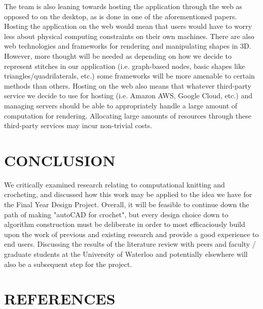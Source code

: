 \documentclass{IEEEcsmag}
\begin{document}
The team is also leaning towards hosting the application through the web as opposed to on the desktop, as is done in one of the aforementioned papers. Hosting the application on the web would mean that users would have to worry less about physical computing constraints on their own machines. There are also web technologies and frameworks for rendering and manipulating shapes in 3D. However, more thought will be needed as depending on how we decide to represent stitches in our application (i.e. graph-based nodes, basic shapes like triangles/quadrilaterals, etc.) some frameworks will be more amenable to certain methods than others. Hosting on the web also means that whatever third-party service we decide to use for hosting (i.e. Amazon AWS, Google Cloud, etc.) and managing servers should be able to appropriately handle a large amount of computation for rendering. Allocating large amounts of resources through these third-party services may incur non-trivial costs.

\section{CONCLUSION}
We critically examined research relating to computational knitting and crocheting, and discussed how this work may be applied to the idea we have for the Final Year Design Project. Overall, it will be feasible to continue down the path of making "autoCAD for crochet", but every design choice down to algorithm construction must be deliberate in order to most efficaciously build upon the work of previous and existing research and provide a good experience to end users. Discussing the results of the literature review with peers and faculty / graduate students at the University of Waterloo and potentially elsewhere will also be a subsequent step for the project.

\section{REFERENCES}
\nocite{*} %
\printbibliography[heading=none]
\end{document}
